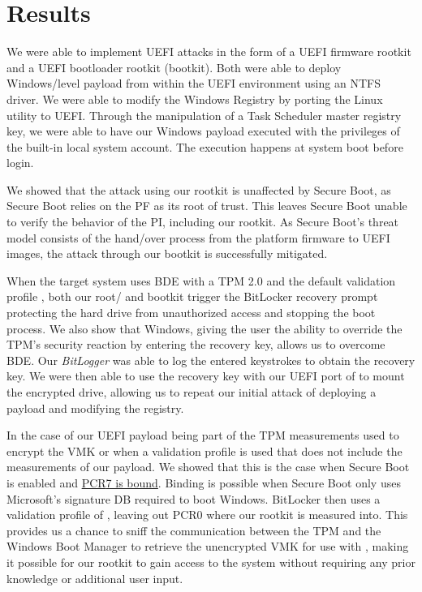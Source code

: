 
\chapter{Results}
\label{sec:results}

We were able to implement \ac{UEFI} attacks in the form of a \ac{UEFI} firmware rootkit and a \ac{UEFI} bootloader rootkit (bootkit).
Both were able to deploy Windows\-/level payload from within the \ac{UEFI} environment using an \ac{NTFS} driver.
We were able to modify the Windows Registry by porting the Linux utility  to \ac{UEFI}.
Through the manipulation of a Task Scheduler master registry key, we were able to have our Windows payload executed with the privileges of the built-in local system account.
The execution happens at system boot before login.

We showed that the attack using our rootkit is unaffected by Secure Boot, as Secure Boot relies on the \ac{PF} as its root of trust.
This leaves Secure Boot unable to verify the behavior of the \ac{PI}, including our rootkit.
As Secure Boot's threat model consists of the hand\-/over process from the platform firmware to \ac{UEFI} images, the attack through our bootkit is successfully mitigated.

When the target system uses \ac{BDE} with a \ac{TPM} 2.0 and the default validation profile \hyperref[tab:pcr-usage]{}, both our root\-/ and bootkit trigger the BitLocker recovery prompt protecting the hard drive from unauthorized access and stopping the boot process.
We also show that Windows, giving the user the ability to override the \ac{TPM}'s security reaction by entering the recovery key, allows us to overcome \ac{BDE}.
Our \emph{BitLogger} was able to log the entered keystrokes to obtain the recovery key.
We were then able to use the recovery key with our \ac{UEFI} port of  to mount the encrypted drive, allowing us to repeat our initial attack of deploying a payload and modifying the registry.

In the case of our \ac{UEFI} payload being part of the \ac{TPM} measurements used to encrypt the \ac{VMK} or when a validation profile is used that does not include the measurements of our payload.
We showed that this is the case when Secure Boot is enabled and \hyperlink{pcr7-binding}{\ac{PCR}7 is bound}.
Binding is possible when Secure Boot only uses Microsoft's signature \ac{DB} required to boot Windows.
BitLocker then uses a validation profile of \hyperref[tab:pcr-usage]{}, leaving out \ac{PCR}0 where our rootkit is measured into.
This provides us a chance to sniff the communication between the \ac{TPM} and the Windows Boot Manager to retrieve the unencrypted \ac{VMK} for use with , making it possible for our rootkit to gain access to the system without requiring any prior knowledge or additional user input.